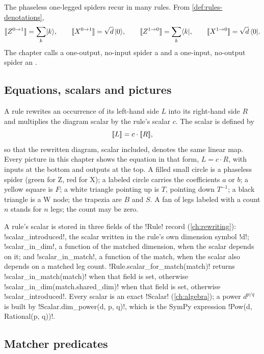 The phaseless one-legged spiders recur in many rules. From \cref{def:rules-denotations},
\begin{equation}\label{eq:rules-states}
\llbracket Z^{0\to1} \rrbracket=\sum_k\lvert k \rangle,\qquad \llbracket X^{0\to1} \rrbracket=\sqrt d\,\lvert 0 \rangle,\qquad
\llbracket Z^{1\to0} \rrbracket=\sum_k\langle k \rvert,\qquad \llbracket X^{1\to0} \rrbracket=\sqrt d\,\langle 0 \rvert.
\end{equation}
The chapter calls a one-output, no-input spider a  and a one-input, no-output spider an .

\subsection{Equations, scalars and pictures}

A rule rewrites an occurrence of its left-hand side $L$ into its right-hand side $R$ and multiplies the diagram scalar by the rule's scalar $c$. The scalar is defined by
\[\llbracket L \rrbracket=c\cdot\llbracket R \rrbracket,\]
so that the rewritten diagram, scalar included, denotes the same linear map. Every picture in this chapter shows the equation in that form, $L=c\cdot R$, with inputs at the bottom and outputs at the top. A filled small circle is a phaseless spider (green for Z, red for X); a labeled circle carries the coefficients $a$ or $b$; a yellow square is $F$; a white triangle pointing up is $T$, pointing down $T^{-1}$; a black triangle is a W node; the trapezia are $B$ and $S$. A fan of legs labeled with a count $n$ stands for $n$ legs; the count may be zero.

A rule's scalar is stored in three fields of the \py!Rule! record (\cref{ch:rewriting}): \py!scalar_introduced!, the scalar written in the rule's own dimension symbol \code!d!; \py!scalar_in_dim!, a function of the matched dimension, when the scalar depends on it; and \py!scalar_in_match!, a function of the match, when the scalar also depends on a matched leg count. \py!Rule.scalar_for_match(match)! returns \py!scalar_in_match(match)! when that field is set, otherwise \py!scalar_in_dim(match.shared_dim)! when that field is set, otherwise \py!scalar_introduced!. Every scalar is an exact \py!Scalar! (\cref{ch:algebra}); a power $d^{p/q}$ is built by \py!Scalar.dim_power(d, p, q)!, which is the SymPy expression \py!Pow(d, Rational(p, q))!.

\subsection{Matcher predicates}\label{sec:rules-predicates}

